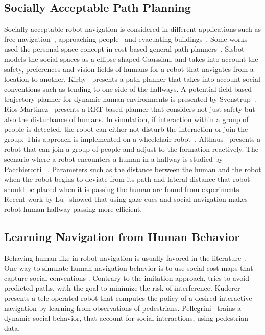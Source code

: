 \subsection{Socially Acceptable Path Planning}
Socially acceptable robot navigation is considered in different applications such as free navigation~\cite{sisbot2007human}, approaching people~\cite{satake2009approach} and evacuating buildings~\cite{ohki2010collision}. Some works used the personal space concept in cost-based general path planners~\cite{sisbot2007human,kirby2009companion}. Sisbot~\cite{sisbot2007human} models the social spaces as a ellipse-shaped Gaussian, and takes into account the safety, preferences and vision fields of humans for a robot that navigates from a location to another. Kirby~\cite{kirby2009companion} presents a path planner that takes into account social conventions such as tending to one side of the hallways. A potential field based trajectory planner for dynamic human environments is presented by Svenstrup~\cite{svenstrup2010trajectory}. Rios-Martinez~\cite{rios2011understanding} presents a RRT-based planner that considers not just safety but also the disturbance of humans. In simulation, if interaction within a group of people is detected, the robot can either not disturb the interaction or join the group. This approach is implemented on a wheelchair robot~\cite{vasquez2012human}. Althaus~\cite{althaus2004navigation} presents a robot that can join a group of people and adjust to the formation reactively. The scenario where a robot encounters a human in a hallway is studied by Pacchierotti ~\cite{pacchierotti2005human}. Parameters such as the distance between the human and the robot when the robot begins to deviate from its path and lateral distance that robot should be placed when it is passing the human are found from experiments. Recent work by Lu~\cite{lu2013towards} showed that using gaze cues and social navigation makes robot-human hallway passing more efficient.

\subsection{Learning Navigation from Human Behavior}

Behaving human-like in robot navigation is usually favored in the literature~\cite{sasaki2006human}. One way to simulate human navigation behavior is to use social cost maps that capture social conventions \cite{scandolo2011anthropomorphic,luber2012socially}. Contrary to the imitation approach, \cite{bennewitz2005learning} tries to avoid predicted paths, with the goal to minimize the risk of interference. Kuderer~\cite{kuderer2013teaching} presents a tele-operated robot that computes the policy of a desired interactive navigation by learning from observations of pedestrians. Pellegrini~\cite{pellegrini2009you} trains a dynamic social behavior, that account for social interactions, using pedestrian data.

